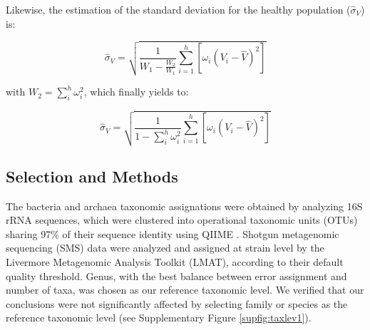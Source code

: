 Likewise, the estimation of the standard deviation for the healthy population ($\widehat{\sigma}_V$) is:
\begin{linenomath}
$$\widehat{\sigma}_V = \sqrt{\frac{1}{W_1-\frac{W_2}{W_1}}\sum_{i=1}^h\left[\omega_i\left(V_i-\hat{V}\right)^2\right]}$$
\end{linenomath}
with $W_2=\sum_i^h \omega_i^2$, which finally yields to:
\begin{linenomath}
$$\widehat{\sigma}_V = \sqrt{\frac{1}{1-\sum_i^h \omega_i^2}\sum_{i=1}^h\left[\omega_i\left(V_i-\hat{V}\right)^2\right]}$$
\end{linenomath}

\subsection*{Selection and Methods}

The bacteria and archaea taxonomic assignations were obtained by analyzing 16S rRNA sequences, which were clustered into operational taxonomic units (OTUs) sharing 97\% of their sequence identity using QIIME \cite{QIIME}. Shotgun metagenomic sequencing (SMS) data\cite{kwashiorkor} were analyzed and assigned at strain level by the Livermore Metagenomic Analysis Toolkit (LMAT)\cite{LMAT}, according to their default quality threshold. Genus, with the best balance between error assignment and number of taxa, was chosen as our reference taxonomic level. We verified that our conclusions were not significantly affected by selecting family or species as the reference taxonomic level (see Supplementary Figure \ref{supfig:taxlev1}).


